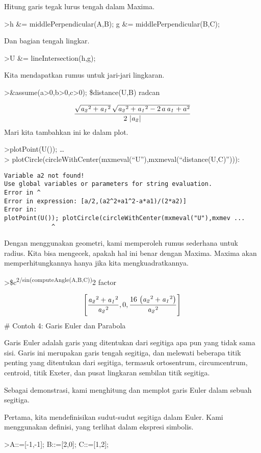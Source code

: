 \documentclass[
]{book}
\begin{document}
Hitung garis tegak lurus tengah dalam Maxima.

\textgreater h \&= middlePerpendicular(A,B); g \&= middlePerpendicular(B,C);

Dan bagian tengah lingkar.

\textgreater U \&= lineIntersection(h,g);

Kita mendapatkan rumus untuk jari-jari lingkaran.

\textgreater\&assume(a\textgreater0,b\textgreater0,c\textgreater0); \$distance(U,B) \textbar{} radcan

\[\frac{\sqrt{{\it a_2}^2+{\it a_1}^2}\,\sqrt{{\it a_2}^2+{\it a_1}^2
 -2\,a\,{\it a_1}+a^2}}{2\,\left| {\it a_2}\right| }\]Mari kita tambahkan ini ke dalam plot.

\textgreater plotPoint(U()); \ldots{}\\
\textgreater{} plotCircle(circleWithCenter(mxmeval(``U''),mxmeval(``distance(U,C)''))):

\begin{verbatim}
Variable a2 not found!
Use global variables or parameters for string evaluation.
Error in ^
Error in expression: [a/2,(a2^2+a1^2-a*a1)/(2*a2)]
Error in:
plotPoint(U()); plotCircle(circleWithCenter(mxmeval("U"),mxmev ...
             ^
\end{verbatim}

Dengan menggunakan geometri, kami memperoleh rumus sederhana untuk radius. Kita bisa mengecek, apakah hal ini benar dengan Maxima. Maxima akan memperhitungkannya hanya jika kita mengkuadratkannya.

\textgreater\$c\textsuperscript{2/sin(computeAngle(A,B,C))}2 \textbar{} factor

\[\left[ \frac{{\it a_2}^2+{\it a_1}^2}{{\it a_2}^2} , 0 , \frac{16\,
 \left({\it a_2}^2+{\it a_1}^2\right)}{{\it a_2}^2} \right] \]\# Contoh 4: Garis Euler dan Parabola

Garis Euler adalah garis yang ditentukan dari segitiga apa pun yang tidak sama sisi. Garis ini merupakan garis tengah segitiga, dan melewati beberapa titik penting yang ditentukan dari segitiga, termasuk ortosentrum, circumcentrum, centroid, titik Exeter, dan pusat lingkaran sembilan titik segitiga.

Sebagai demonstrasi, kami menghitung dan memplot garis Euler dalam sebuah segitiga.

Pertama, kita mendefinisikan sudut-sudut segitiga dalam Euler. Kami menggunakan definisi, yang terlihat dalam ekspresi simbolis.

\textgreater A::={[}-1,-1{]}; B::={[}2,0{]}; C::={[}1,2{]};
\end{document}
